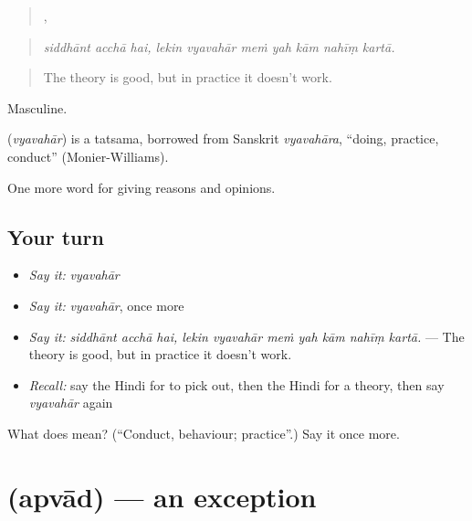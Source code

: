 \begin{quote}
  ,       
\end{quote}

\begin{quote}
\emph{siddhānt acchā hai, lekin vyavahār meṁ yah kām nahīṃ kartā.}
\end{quote}

\begin{quote}
The theory is good, but in practice it doesn't work.
\end{quote}

Masculine.

\begin{cousinweb}
\textbf{} (\emph{vyavahār}) is a tatsama, borrowed from Sanskrit \emph{vyavahāra}, \textquotedblleft{}doing, practice, conduct\textquotedblright{} (Monier-Williams).
\end{cousinweb}

\begin{grammarlens}[title={What you've built}]
One more word for giving reasons and opinions.
\end{grammarlens}

\subsection*{Your turn}
\begin{itemize}
\raggedright
  \item \emph{Say it:} \emph{vyavahār}
  \item \emph{Say it:} \emph{vyavahār}, once more
  \item \emph{Say it:} \emph{siddhānt acchā hai, lekin vyavahār meṁ yah kām nahīṃ kartā.} — The theory is good, but in practice it doesn't work.
  \item \emph{Recall:} say the Hindi for to pick out, then the Hindi for a theory, then say \emph{vyavahār} again
\end{itemize}

\begin{tcolorbox}[breakable,colback=teal!4,colframe=teal!35!black,title={Before you move on}]
What does  mean? (\textquotedblleft{}Conduct, behaviour; practice\textquotedblright{}.) Say it once more.
\end{tcolorbox}
\section[\texorpdfstring{\hi{अपवाद} (apvād)}{अपवाद (apvād)}]{ (apvād) — an exception}

